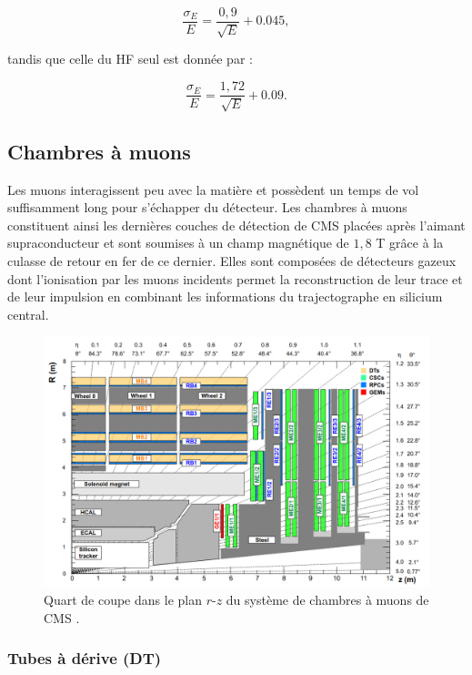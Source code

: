 \begin{equation}
    \frac{\sigma_E}{E}=\frac{0,9}{\sqrt{E}}+0.045,
\end{equation}

tandis que celle du HF seul est donnée par :

\begin{equation}
    \frac{\sigma_E}{E}=\frac{1,72}{\sqrt{E}}+0.09.
\end{equation}

\subsection{Chambres à muons}

Les muons interagissent peu avec la matière et possèdent un temps de vol suffisamment long pour s'échapper du détecteur. Les chambres à muons constituent ainsi les dernières couches de détection de CMS placées après l'aimant supraconducteur et sont soumises à un champ magnétique de $1,8$ T grâce à la culasse de retour en fer de ce dernier. Elles sont composées de détecteurs gazeux dont l'ionisation par les muons incidents permet la reconstruction de leur trace et de leur impulsion en combinant les informations du trajectographe en silicium central. 

\begin{figure}
\centering
    \includegraphics[scale=0.37]{Chapitre3/Images/MUONS.png} 
\caption{Quart de coupe dans le plan $r$-$z$ du système de chambres à muons de CMS \cite{MUONS}.}
\label{muons}
\end{figure}

\subsubsection{ Tubes à dérive (DT)}

